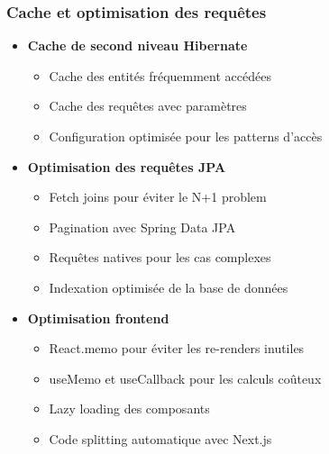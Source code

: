 \documentclass[12pt,a4paper]{report}
\begin{document}
\subsubsection{Cache et optimisation des requêtes}
\begin{itemize}
\item \textbf{Cache de second niveau Hibernate}
  \begin{itemize}
  \item Cache des entités fréquemment accédées
  \item Cache des requêtes avec paramètres
  \item Configuration optimisée pour les patterns d'accès
  \end{itemize}

\item \textbf{Optimisation des requêtes JPA}
  \begin{itemize}
  \item Fetch joins pour éviter le N+1 problem
  \item Pagination avec Spring Data JPA
  \item Requêtes natives pour les cas complexes
  \item Indexation optimisée de la base de données
  \end{itemize}

\item \textbf{Optimisation frontend}
  \begin{itemize}
  \item React.memo pour éviter les re-renders inutiles
  \item useMemo et useCallback pour les calculs coûteux
  \item Lazy loading des composants
  \item Code splitting automatique avec Next.js
  \end{itemize}
\end{itemize}
\end{document}
